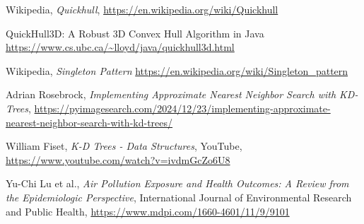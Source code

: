 \documentclass{ieeetj}
\begin{document}
\begin{thebibliography}{9}
Wikipedia, \textit{Quickhull}, \url{https://en.wikipedia.org/wiki/Quickhull}

QuickHull3D: A Robust 3D Convex Hull Algorithm in Java
\url{https://www.cs.ubc.ca/~lloyd/java/quickhull3d.html}

Wikipedia, \textit{Singleton Pattern} \url{https://en.wikipedia.org/wiki/Singleton_pattern}


Adrian Rosebrock, \textit{Implementing Approximate Nearest Neighbor Search with KD-Trees}, \url{https://pyimagesearch.com/2024/12/23/implementing-approximate-nearest-neighbor-search-with-kd-trees/}

William Fiset, \textit{K-D Trees - Data Structures}, YouTube, \url{https://www.youtube.com/watch?v=ivdmGcZo6U8}

Yu-Chi Lu et al., \textit{Air Pollution Exposure and Health Outcomes: A Review from the Epidemiologic Perspective}, International Journal of Environmental Research and Public Health, \url{https://www.mdpi.com/1660-4601/11/9/9101}
\end{thebibliography}
\end{document}

